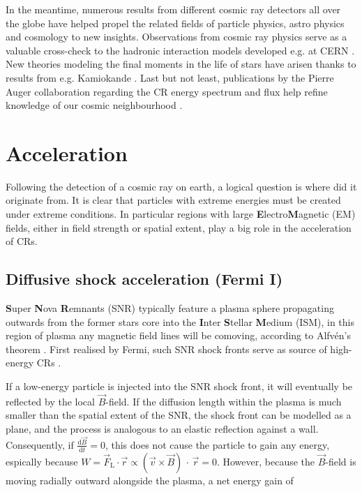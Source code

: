 In the meantime, numerous results from different cosmic ray detectors all over the globe have helped propel the related fields of particle physics, astro physics 
and cosmology to new insights. Observations from cosmic ray physics serve as a valuable cross-check to the hadronic interaction models developed e.g. at CERN 
\cite{ostapchenko2007status}. New theories modeling the final moments in the life of stars have arisen thanks to results from e.g. Kamiokande 
\cite{goldman1988implications}. Last but not least, publications by the Pierre Auger collaboration regarding the CR energy spectrum and flux help refine knowledge of 
our cosmic neighbourhood \cite{abraham2010measurement, aab2015searches}.

\section{Acceleration}
\label{sec:cr-acceleration}

Following the detection of a cosmic ray on earth, a logical question is where did it originate from. It is clear that particles with extreme energies must be created 
under extreme conditions. In particular regions with large \textbf{E}lectro\textbf{M}agnetic (EM) fields, either in field strength or spatial extent, play a big role 
in the acceleration of CRs.

\subsection{Diffusive shock acceleration (Fermi I)}
\label{ssec:cr-fermi-i}

\textbf{S}uper \textbf{N}ova \textbf{R}emnants (SNR) typically feature a plasma sphere propagating outwards from the former stars core into the 
\textbf{I}nter \textbf{S}tellar \textbf{M}edium (ISM), in this region of plasma any magnetic field lines will be comoving, according to Alfvén's theorem 
\cite{alfven1942existence}. First realised by Fermi, such SNR shock fronts serve as source of high-energy CRs \cite{fermi1949origin}.

If a low-energy particle is injected into the SNR shock front, it will eventually be reflected by the local $\vec{B}$-field. If the diffusion length within the
plasma is much smaller than the spatial extent of the SNR, the shock front can be modelled as a plane, and the process is analogous to an elastic reflection 
against a wall. Consequently, if $\frac{\text{d}\vec{B}}{\text{d}t} = 0$, this does not cause the particle to gain any energy, espically because 
$W = \vec{F}_\text{L} \cdot \vec{r} \propto (\vec{v}\times\vec{B})\,\cdot\,\vec{r} = 0$. However, because the $\vec{B}$-field is moving radially outward alongside 
the plasma, a net energy gain of 

